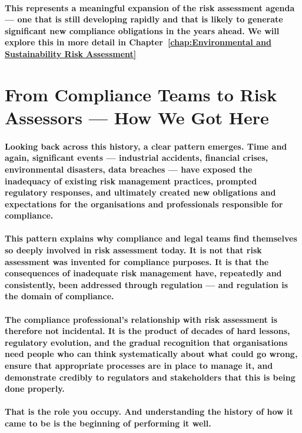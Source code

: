 \paragraph{This represents a meaningful expansion of the risk assessment agenda — one that is still developing rapidly and that is likely to generate significant new compliance obligations in the years ahead. We will explore this in more detail in Chapter~\ref{chap:Environmental and Sustainability Risk Assessment}}

\section{From Compliance Teams to Risk Assessors — How We Got Here}
\paragraph{Looking back across this history, a clear pattern emerges. Time and again, significant events — industrial accidents, financial crises, environmental disasters, data breaches — have exposed the inadequacy of existing risk management practices, prompted regulatory responses, and ultimately created new obligations and expectations for the organisations and professionals responsible for compliance.}
\paragraph{This pattern explains why compliance and legal teams find themselves so deeply involved in risk assessment today. It is not that risk assessment was invented for compliance purposes. It is that the consequences of inadequate risk management have, repeatedly and consistently, been addressed through regulation — and regulation is the domain of compliance.}
\paragraph{The compliance professional's relationship with risk assessment is therefore not incidental. It is the product of decades of hard lessons, regulatory evolution, and the gradual recognition that organisations need people who can think systematically about what could go wrong, ensure that appropriate processes are in place to manage it, and demonstrate credibly to regulators and stakeholders that this is being done properly.}
\paragraph{That is the role you occupy. And understanding the history of how it came to be is the beginning of performing it well.}

